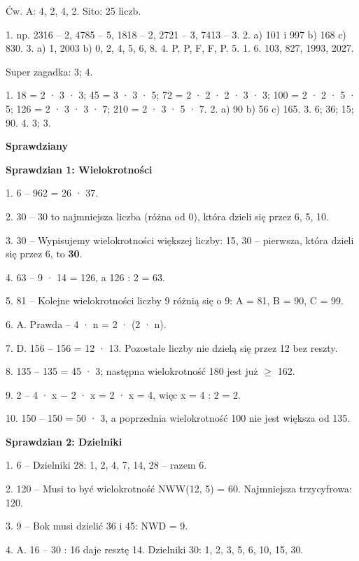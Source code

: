 Ćw. A: 4, 2, 4, 2. Sito: 25 liczb.\par
1. np. 2316 – 2, 4785 – 5, 1818 – 2, 2721 – 3, 7413 – 3.
2. a) 101 i 997 b) 168 c) 830.
3. a) 1, 2003 b) 0, 2, 4, 5, 6, 8.
4. P, P, F, F, P.
5. 1.
6. 103, 827, 1993, 2027.\par
Super zagadka: 3; 4.

1. 18 = 2 · 3 · 3; 45 = 3 · 3 · 5; 72 = 2 · 2 · 2 · 3 · 3; 100 = 2 · 2 · 5 · 5; 126 = 2 · 3 · 3 · 7; 210 = 2 · 3 · 5 · 7.
2. a) 90 b) 56 c) 165.
3. 6; 36; 15; 90.
4. 3; 3.

\textbf{\large Sprawdziany}\par\smallskip
\textbf{\color{pomd}Sprawdzian 1: Wielokrotności}\par
1. 6 {\color{szary}– 962 = 26 · 37.}\par
2. 30 {\color{szary}– 30 to najmniejsza liczba (różna od 0), która dzieli się przez 6, 5, 10.}\par
3. 30 {\color{szary}– Wypisujemy wielokrotności większej liczby: 15, 30 – pierwsza, która dzieli się przez 6, to \textbf{30}.}\par
4. 63 {\color{szary}– 9 · 14 = 126, a 126 : 2 = 63.}\par
5. 81 {\color{szary}– Kolejne wielokrotności liczby 9 różnią się o 9: A = 81, B = 90, C = 99.}\par
6. A. Prawda {\color{szary}– 4 · n = 2 · (2 · n).}\par
7. D. 156 {\color{szary}– 156 = 12 · 13. Pozostałe liczby nie dzielą się przez 12 bez reszty.}\par
8. 135 {\color{szary}– 135 = 45 · 3; następna wielokrotność 180 jest już $\geq$ 162.}\par
9. 2 {\color{szary}– 4 · x − 2 · x = 2 · x = 4, więc x = 4 : 2 = 2.}\par
10. 150 {\color{szary}– 150 = 50 · 3, a poprzednia wielokrotność 100 nie jest większa od 135.}\par
\medskip
\textbf{\color{pomd}Sprawdzian 2: Dzielniki}\par
1. 6 {\color{szary}– Dzielniki 28: 1, 2, 4, 7, 14, 28 – razem 6.}\par
2. 120 {\color{szary}– Musi to być wielokrotność NWW(12, 5) = 60. Najmniejsza trzycyfrowa: 120.}\par
3. 9 {\color{szary}– Bok musi dzielić 36 i 45: NWD = 9.}\par
4. A. 16 {\color{szary}– 30 : 16 daje resztę 14. Dzielniki 30: 1, 2, 3, 5, 6, 10, 15, 30.}\par

